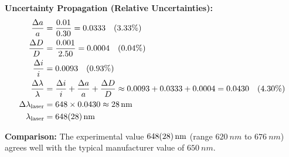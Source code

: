 \documentclass[11pt]{article}
\begin{document}
\begin{exoresolu}
\textbf{Uncertainty Propagation (Relative Uncertainties):}
\begin{align*}
\frac{\Delta a}{a} &= \frac{0.01}{0.30} = 0.0333 \quad (3.33\%) \\
\frac{\Delta D}{D} &= \frac{0.001}{2.50} = 0.0004 \quad (0.04\%) \\
\frac{\Delta i}{i} &= 0.0093 \quad (0.93\%) \\
\frac{\Delta \lambda}{\lambda} &= \frac{\Delta i}{i} + \frac{\Delta a}{a} + \frac{\Delta D}{D} \approx 0.0093 + 0.0333 + 0.0004 = 0.0430 \quad (4.30\%) \\
\Delta \lambda_{\text{laser}} &= 648 \times 0.0430 \approx \SI{28}{nm} \\
\lambda_{\text{laser}} &= \SI{648 \pm 28}{nm}
\end{align*}

\textbf{Comparison:} The experimental value $\SI{648 \pm 28}{nm}$ (range $\SI{620}{nm}$ to $\SI{676}{nm}$) agrees well with the typical manufacturer value of $\SI{650}{nm}$.


\end{exoresolu}
\end{document}
